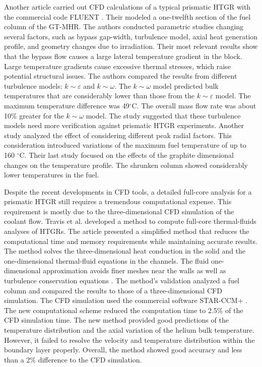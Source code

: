 Another article \cite{sato_computational_2010} carried out \gls{CFD} calculations of a typical prismatic \gls{HTGR} with the commercial code FLUENT \cite{fluent_inc_fluent_2006}.
Their modeled a one-twelfth section of the fuel column of the GT-MHR.
The authors conducted parametric studies changing several factors, such as bypass gap-width, turbulence model, axial heat generation profile, and geometry changes due to irradiation.
Their most relevant results show that the bypass flow causes a large lateral temperature gradient in the block.
Large temperature gradients cause excessive thermal stresses, which raise potential structural issues.
The authors compared the results from different turbulence models: $k \sim \varepsilon$ and $k \sim \omega$.
The $k \sim \omega$ model predicted bulk temperatures that are considerably lower than those from the $k \sim \varepsilon$ model.
The maximum temperature difference was 49$^{\circ}$C.
The overall mass flow rate was about 10$\%$ greater for the $k \sim \omega$ model.
The study suggested that these turbulence models need more verification against prismatic \gls{HTGR} experiments.
Another study analyzed the effect of considering different peak radial factors.
This consideration introduced variations of the maximum fuel temperature of up to 160 $^{\circ}$C.
Their last study focused on the effects of the graphite dimensional changes on the temperature profile.
The shrunken column showed considerably lower temperatures in the fuel.

Despite the recent developments in CFD tools, a detailed full-core analysis for a prismatic \gls{HTGR} still requires a tremendous computational expense.
This requirement is mostly due to the three-dimensional CFD simulation of the coolant flow.
Travis et al. \cite{travis_thermalhydraulics_2013} developed a method to compute full-core thermal-fluids analyses of \glspl{HTGR}.
The article presented a simplified method that reduces the computational time and memory requirements while maintaining accurate results.
The method solves the three-dimensional heat conduction in the solid and the one-dimensional thermal-fluid equations in the channels.
The fluid one-dimensional approximation avoids finer meshes near the walls as well as turbulence conservation equations \cite{tak_development_2014}.
The method's validation analyzed a fuel column and compared the results to those of a three-dimensional CFD simulation.
The CFD simulation used the commercial software STAR-CCM+ \cite{cd-adapco_star-ccm_2012}.
The new computational scheme reduced the computation time to 2.5\% of the CFD simulation time.
The new method provided good predictions of the temperature distribution and the axial variation of the helium bulk temperature.
However, it failed to resolve the velocity and temperature distribution within the boundary layer properly.
Overall, the method showed good accuracy and less than a 2\% difference to the CFD simulation.

